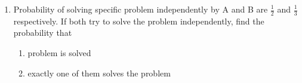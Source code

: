 \renewcommand{\theequation}{\theenumi}
\begin{enumerate}[label=\thesection.\arabic*.,ref=\thesection.\theenumi]
\item Probability of solving specific problem
independently by A and B are $\frac{1}{2}$ and $\frac{1}{3}$
respectively. If both try to solve the problem
independently, find the probability that
\begin{enumerate}
\item problem is solved
\item exactly one of them solves the problem
\end{enumerate}

\end{enumerate}